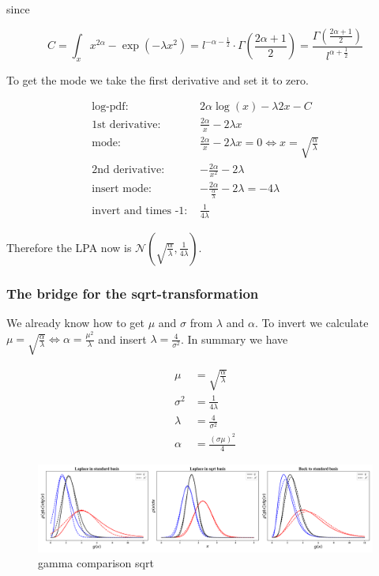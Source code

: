 \documentclass{article}
\begin{document}
since 

\begin{equation}
	C = \int_x x^{2\alpha} - \exp(-\lambda x^2) = l^{-\alpha-\frac{1}{2}} \cdot \Gamma\left(\frac{2\alpha+1}{2}\right) = \frac{ \Gamma\left(\frac{2\alpha+1}{2}\right)}{l^{\alpha+\frac{1}{2}}}
\end{equation}

To get the mode we take the first derivative and set it to zero. 

\begin{align}
\text{log-pdf: } &2\alpha \log(x) - \lambda 2x - C \\
\text{1st derivative: }&  \frac{2\alpha}{x} - 2\lambda x\\
\text{mode: }& \frac{2\alpha}{x} - 2\lambda x = 0 \Leftrightarrow x = \sqrt{\frac{\alpha}{\lambda}}\\
\text{2nd derivative: }&  -\frac{2\alpha}{x^2} - 2\lambda\\
\text{insert mode: }& -\frac{2\alpha}{\frac{\alpha}{\lambda}} - 2\lambda = -4\lambda\\
\text{invert and times -1: }& \frac{1}{4\lambda}
\end{align}

Therefore the LPA now is $\mathcal{N}\left(\sqrt{\frac{\alpha}{\lambda}}, \frac{1}{4\lambda} \right)$.

\subsubsection{The bridge for the sqrt-transformation}

We already know how to get $\mu$ and $\sigma$ from $\lambda$ and $\alpha$. To invert we calculate $\mu = \sqrt{\frac{\alpha}{\lambda}} \Leftrightarrow \alpha = \frac{\mu^2}{\lambda}$ and insert $\lambda=\frac{4}{\sigma^2}$. In summary we have

\begin{align}
\mu &= \sqrt{\frac{\alpha}{\lambda}} \\
\sigma^2 &= \frac{1}{4\lambda} \\
\lambda &= \frac{4}{\sigma^2} \\
\alpha &= \frac{(\sigma\mu)^2}{4} 
\end{align}

\begin{figure}[!htb]
	\centering
	\includegraphics[width=\textwidth]{figures/gamma_bridge_sqrt.pdf}
	\caption{gamma comparison sqrt}
	\label{fig:gamma_comparison_square}
\end{figure}
\end{document}
